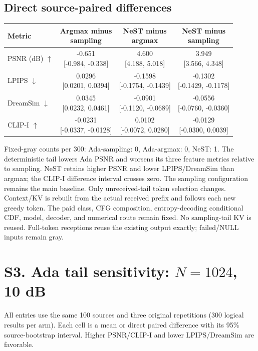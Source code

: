 \documentclass[11pt,letterpaper]{article}
\begin{document}
\subsection*{Direct source-paired differences}
\begin{center}\small\setlength{\tabcolsep}{7pt}\renewcommand{\arraystretch}{1.55}
\begin{tabular}{lccc}
\toprule
Metric & \shortstack{Argmax minus\\sampling} & \shortstack{NeST minus\\argmax} & \shortstack{NeST minus\\sampling}\\\midrule
PSNR (dB) $\uparrow$ & \shortstack{-0.651\\{}[-0.984, -0.338]} & \shortstack{4.600\\{}[4.188, 5.018]} & \shortstack{3.949\\{}[3.566, 4.348]}\\
LPIPS $\downarrow$ & \shortstack{0.0296\\{}[0.0201, 0.0394]} & \shortstack{-0.1598\\{}[-0.1754, -0.1439]} & \shortstack{-0.1302\\{}[-0.1429, -0.1178]}\\
DreamSim $\downarrow$ & \shortstack{0.0345\\{}[0.0232, 0.0461]} & \shortstack{-0.0901\\{}[-0.1120, -0.0689]} & \shortstack{-0.0556\\{}[-0.0760, -0.0360]}\\
CLIP-I $\uparrow$ & \shortstack{-0.0231\\{}[-0.0337, -0.0128]} & \shortstack{0.0102\\{}[-0.0072, 0.0280]} & \shortstack{-0.0129\\{}[-0.0300, 0.0039]}\\
\bottomrule\end{tabular}\end{center}
Fixed-gray counts per 300: Ada-sampling: 0, Ada-argmax: 0, NeST: 1.
The deterministic tail lowers Ada PSNR and worsens its three feature metrics relative to sampling. NeST retains higher PSNR and lower LPIPS/DreamSim than argmax; the CLIP-I difference interval crosses zero. The sampling configuration remains the main baseline.
Only unreceived-tail token selection changes. Context/KV is rebuilt from the actual received prefix and follows each new greedy token. The paid class, CFG composition, entropy-decoding conditional CDF, model, decoder, and numerical route remain fixed. No sampling-tail KV is reused. Full-token receptions reuse the existing output exactly; failed/NULL inputs remain gray.
\clearpage\section*{S3. Ada tail sensitivity: $N=1024$, 10 dB}
All entries use the same 100 sources and three original repetitions (300 logical results per arm). Each cell is a mean or direct paired difference with its 95\% source-bootstrap interval. Higher PSNR/CLIP-I and lower LPIPS/DreamSim are favorable.
\end{document}
